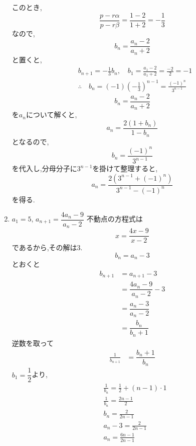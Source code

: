 \documentclass[dvipdfmx,a4paper,11pt,fleqn,openany]{jsbook}
\begin{document}
\begin{multicols*}{2}
\begin{enumerate}[label=(\arabic*),parsep=3pt]
              このとき,
              \[
                \frac{p-r\alpha}{p-r\beta}=\frac{1-2}{1+2}=-\frac13
              \]
              なので,
              \[
                b_n=\frac{a_n-2}{a_n+2}
              \]
              と置くと,
              \begin{align*}
                &b_{n+1}=-\frac13 b_n,\quad b_1=\frac{a_1-2}{a_1+2}=\frac{-2}{2}=-1\\
                &\therefore \quad b_n=(-1)\left(-\frac13\right)^{n-1}=\frac{(-1)^n}{3^{n-1}}
              \end{align*}
              \[
                b_n=\frac{a_n-2}{a_n+2}
              \]
              を$a_n$について解くと,
              \[
                a_n=\frac{2(1+b_n)}{1-b_n}
              \]
              となるので,
              \[
                b_n=\frac{(-1)^n}{3^{n-1}}
              \]
              を代入し,分母分子に$3^{n-1}$を掛けて整理すると,
              \[
                a_n=\frac{2\left(3^{n-1}+(-1)^n\right)}{3^{n-1}-(-1)^n}
              \]
              を得る.
        \item $\displaystyle a_1=5,\, a_{n+1}=\dfrac{4a_{n}-9}{a_{n}-2}$
              不動点の方程式は
              \[
                x=\frac{4x-9}{x-2}
              \]
              であるから,その解は3.
              \[
              b_n=a_n-3
              \]
              とおくと
              \begin{align*}
                b_{n+1}&=a_{n+1}-3\\
                &=\dfrac{4a_{n}-9}{a_{n}-2}-3\\
                &=\dfrac{a_{n}-3}{a_{n}-2}\\
                &=\dfrac{b_{n}}{b_{n}+1}
              \end{align*}
              逆数を取って
              \begin{align*}
                \frac{1}{b_{n+1}}&=\dfrac{b_{n}+1}{b_{n}}
              \end{align*}
              $b_1=\dfrac{1}{2}$より,
              \begin{align*}
                &\frac{1}{b_n}=\frac{1}{2}+(n-1)\cdot 1\\
                &\frac{1}{b_n}=\frac{2n-1}{2}\\
                &b_n=\frac{2}{2n-1}\\
                &a_n-3=\frac{2}{2n-1}\\
                &a_n=\frac{6n-1}{2n-1}
              \end{align*}

\end{enumerate}
\end{multicols*}
\end{document}
